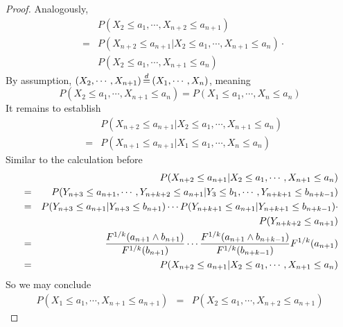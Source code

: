 \documentclass{report}
\begin{document}
\begin{enumerate}[1.]
\begin{enumerate}[(a)]
\begin{proof}
      Analogously,
      \begin{eqnarray*}
        && P(X_2 \le a_1, \cdots, X_{n+2} \le a_{n+1}) \\
        &=& P(X_{n+2} \le a_{n+1} | X_2 \le a_1, \cdots, X_{n+1} \le
        a_{n}) \cdot \\
        && P(X_2 \le a_1, \cdots, X_{n+1} \le a_{n})
      \end{eqnarray*}
      By assumption, $(X_2, \cdots, X_{n+1}) \ed (X_1, \cdots, X_{n})$,
      meaning
      \[
      P(X_2 \le a_1, \cdots, X_{n+1} \le a_{n}) = P(X_1 \le
      a_1, \cdots, X_{n} \le a_{n})
      \]
      It remains to establish
      \begin{eqnarray*}
        && P(X_{n+2} \le a_{n+1} | X_2 \le a_1, \cdots, X_{n+1} \le
        a_{n}) \\
        &=& P(X_{n+1} \le a_{n+1} | X_1 \le a_1, \cdots, X_{n} \le
        a_{n})
      \end{eqnarray*}
      Similar to the calculation before
      \begin{eqnarray*}
        && P(X_{n+2} \le a_{n+1} | X_2 \le a_1, \cdots, X_{n+1} \le
        a_{n})      \\
        &=& P(Y_{n+3} \le a_{n+1}, \cdots, Y_{n+k+2} \le a_{n+1} | Y_3
        \le b_1, \cdots, Y_{n+k+1} \le b_{n+k-1}) \\
        &=& P(Y_{n+3} \le a_{n+1} | Y_{n+3} \le b_{n+1}) \cdots
        P(Y_{n+k+1} \le a_{n+1} | Y_{n+k+1} \le b_{n+k-1}) \cdot \\
        && P(Y_{n+k+2} \le a_{n+1}) \\
        &=& {F^{1/k}(a_{n+1} \wedge b_{n+1}) \over F^{1/k}(b_{n+1})} \cdots
        {F^{1/k}(a_{n+1} \wedge b_{n+k-1}) \over F^{1/k}(b_{n+k-1})}
        F^{1/k}(a_{n+1}) \\
        &=& P(X_{n+2} \le a_{n+1} | X_2 \le a_1, \cdots, X_{n+1} \le
        a_{n})\\
      \end{eqnarray*}
      So we may conclude
      \begin{eqnarray*}
        P(X_1 \le a_1, \cdots, X_{n+1} \le a_{n+1}) &=& P(X_2 \le a_1,
        \cdots, X_{n+2} \le a_{n+1})
      \end{eqnarray*}
    \end{proof}


\end{enumerate}
\end{enumerate}
\end{document}
